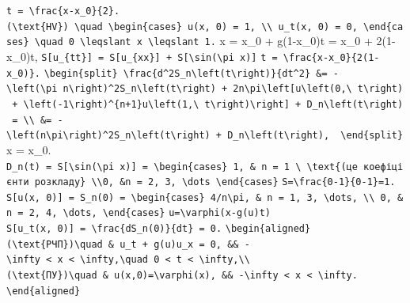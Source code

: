 \documentclass[
  ukrainian,
]{article}
\begin{document}
\texttt{t\ =\ \textbackslash{}frac\{x-x\_0\}\{2\}.}
\texttt{(\textbackslash{}text\{HV\})\ \textbackslash{}quad\ \textbackslash{}begin\{cases\}\ u(x,\ 0)\ =\ 1,\ \textbackslash{}\textbackslash{}\ u\_t(x,\ 0)\ =\ 0,\ \textbackslash{}end\{cases\}\ \textbackslash{}quad\ 0\ \textbackslash{}leqslant\ x\ \textbackslash{}leqslant\ 1.}
x = x\_0 + g(1-x\_0)t = x\_0 + 2(1-x\_0)t,
\texttt{S{[}u\_\{tt\}{]}\ =\ S{[}u\_\{xx\}{]}\ +\ S{[}\textbackslash{}sin(\textbackslash{}pi\ x){]}}
\texttt{t\ =\ \textbackslash{}frac\{x-x\_0\}\{2(1-x\_0)\}.}
\texttt{\textbackslash{}begin\{split\}\ \textbackslash{}frac\{d\^{}2S\_n\textbackslash{}left(t\textbackslash{}right)\}\{dt\^{}2\}\ \&=\ -\textbackslash{}left(\textbackslash{}pi\ n\textbackslash{}right)\^{}2S\_n\textbackslash{}left(t\textbackslash{}right)\ +\ 2n\textbackslash{}pi\textbackslash{}left{[}u\textbackslash{}left(0,\textbackslash{}\ t\textbackslash{}right)\ +\ \textbackslash{}left(-1\textbackslash{}right)\^{}\{n+1\}u\textbackslash{}left(1,\textbackslash{}\ t\textbackslash{}right)\textbackslash{}right{]}\ +\ D\_n\textbackslash{}left(t\textbackslash{}right)\ =\ \textbackslash{}\textbackslash{}\ \&=\ -\textbackslash{}left(n\textbackslash{}pi\textbackslash{}right)\^{}2S\_n\textbackslash{}left(t\textbackslash{}right)\ +\ D\_n\textbackslash{}left(t\textbackslash{}right),\ \ \textbackslash{}end\{split\}}
x = x\_0.
\texttt{D\_n(t)\ =\ S{[}\textbackslash{}sin(\textbackslash{}pi\ x){]}\ =\ \textbackslash{}begin\{cases\}\ 1,\ \&\ n\ =\ 1\ \textbackslash{}\ \textbackslash{}text\{(це\ коефіцієнти\ розкладу\}\ \textbackslash{}\textbackslash{}0,\ \&n\ =\ 2,\ 3,\ \textbackslash{}dots\ \textbackslash{}end\{cases\}}
\texttt{S=\textbackslash{}frac\{0-1\}\{0-1\}=1.}
\texttt{S{[}u(x,\ 0){]}\ =\ S\_n(0)\ =\ \textbackslash{}begin\{cases\}\ 4/n\textbackslash{}pi,\ \&\ n\ =\ 1,\ 3,\ \textbackslash{}dots,\ \textbackslash{}\textbackslash{}\ 0,\ \&n\ =\ 2,\ 4,\ \textbackslash{}dots,\ \textbackslash{}end\{cases\}}
\texttt{u=\textbackslash{}varphi(x-g(u)t)}
\texttt{S{[}u\_t(x,\ 0){]}\ =\ \textbackslash{}frac\{dS\_n(0)\}\{dt\}\ =\ 0.}
\texttt{\textbackslash{}begin\{aligned\}}
\texttt{(\textbackslash{}text\{РЧП\})\textbackslash{}quad\ \&\ u\_t\ +\ g(u)u\_x\ =\ 0,\ \&\&\ -\textbackslash{}infty\ \textless{}\ x\ \textless{}\ \textbackslash{}infty,\textbackslash{}quad\ 0\ \textless{}\ t\ \textless{}\ \textbackslash{}infty,\textbackslash{}\textbackslash{}}
\texttt{(\textbackslash{}text\{ПУ\})\textbackslash{}quad\ \&\ u(x,0)=\textbackslash{}varphi(x),\ \&\&\ -\textbackslash{}infty\ \textless{}\ x\ \textless{}\ \textbackslash{}infty.}
\texttt{\textbackslash{}end\{aligned\}}
\end{document}
